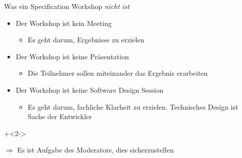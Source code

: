 \begin{frame}{Was ein Specification Workshop \em nicht \em ist}

\begin{itemize}
	\item Der Workshop ist kein Meeting
	\begin{itemize}
		\item Es geht darum, Ergebnisse zu erzielen
	\end{itemize}
	
	\item Der Workshop ist keine Präsentation
	\begin{itemize}
		\item Die Teilnehmer sollen miteinander das Ergebnis erarbeiten
	\end{itemize}
	
	\item Der Workshop ist keine Software Design Session
	\begin{itemize}
		\item Es geht darum, fachliche Klarheit zu erzielen. Technisches Design ist Sache der Entwickler
	\end{itemize}
	
\end{itemize}

\onslide+<2->
	
$\Rightarrow$ Es ist Aufgabe des Moderators, dies sicherzustellen

\end{frame}


